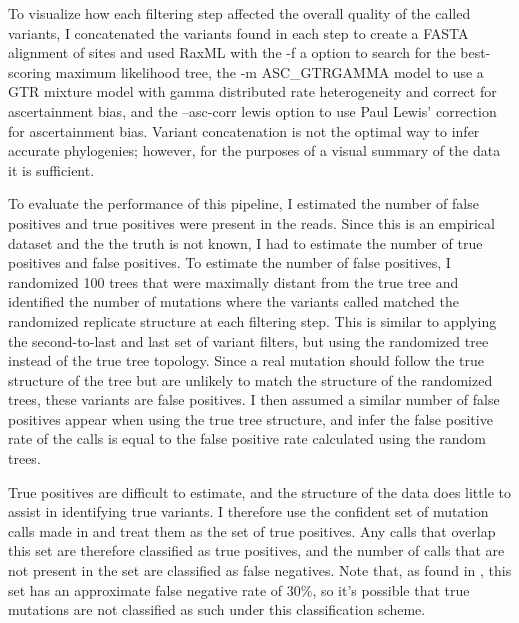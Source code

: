 \documentclass{article}
\begin{document}
\begin{outline}
	\item To visualize how each filtering step affected the overall quality of the called variants, I concatenated the variants found in each step to create a FASTA alignment of sites and used RaxML with the -f a option to search for the best-scoring maximum likelihood tree, the -m ASC\_GTRGAMMA model to use a GTR mixture model with gamma distributed rate heterogeneity and correct for ascertainment bias, and the --asc-corr lewis option to use Paul Lewis' correction for ascertainment bias. Variant concatenation is not the optimal way to infer accurate phylogenies; however, for the purposes of a visual summary of the data it is sufficient.

	\item To evaluate the performance of this pipeline, I estimated the number of false positives and true positives were present in the reads. Since this is an empirical dataset and the the truth is not known, I had to estimate the number of true positives and false positives. To estimate the number of false positives, I randomized 100 trees that were maximally distant from the true tree and identified the number of mutations where the variants called matched the randomized replicate structure at each filtering step. This is similar to applying the second-to-last and last set of variant filters, but using the randomized tree instead of the true tree topology. Since a real mutation should follow the true structure of the tree but are unlikely to match the structure of the randomized trees, these variants are false positives. I then assumed a similar number of false positives appear when using the true tree structure, and infer the false positive rate of the calls is equal to the false positive rate calculated using the random trees.  %
	\item True positives are difficult to estimate, and the structure of the data does little to assist in identifying true variants. I therefore use the confident set of mutation calls made in \cite{orr_phylogenomic_2020} and treat them as the set of true positives. Any calls that overlap this set are therefore classified as true positives, and the number of calls that are not present in the set are classified as false negatives. Note that, as found in \cite{orr_phylogenomic_2020}, this set has an approximate false negative rate of 30\%, so it's possible that true mutations are not classified as such under this classification scheme. %
\end{outline}
\end{document}
